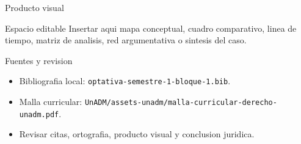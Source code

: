 \documentclass[
  spanish,
  aspectratio=169,
  xcolor={dvipsnames,table}
]{beamer}
\begin{document}
\begin{frame}{Producto visual}
  \begin{block}{Espacio editable}
    Insertar aqui mapa conceptual, cuadro comparativo, linea de tiempo,
    matriz de analisis, red argumentativa o sintesis del caso.
  \end{block}
  \centering
\end{frame}

\begin{frame}{Fuentes y revision}
  \begin{itemize}
    \item Bibliografia local: \texttt{optativa-semestre-1-bloque-1.bib}.
    \item Malla curricular: \texttt{UnADM/assets-unadm/malla-curricular-derecho-unadm.pdf}.
    \item Revisar citas, ortografia, producto visual y conclusion juridica.
  \end{itemize}
\end{frame}
\end{document}
